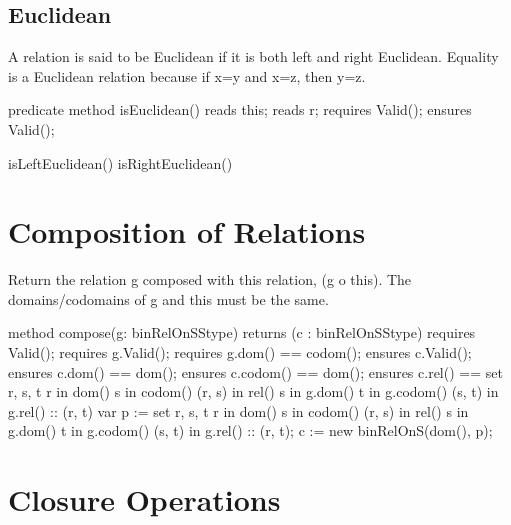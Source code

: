 \documentclass[letterpaper,10pt,english]{sphinxmanual}
\begin{document}
\subsection{Euclidean}
\label{\detokenize{08-relations:euclidean}}
A relation is said to be Euclidean if it is both left and right
Euclidean. Equality is a Euclidean relation because if x=y and x=z,
then y=z.

\begin{sphinxVerbatim}[commandchars=\\\{\}]
predicate method isEuclidean()
    reads this;
    reads r;
    requires Valid();
    ensures Valid();

\PYGZob{}
    isLeftEuclidean() \PYGZam{}\PYGZam{} isRightEuclidean()
\PYGZcb{}
\end{sphinxVerbatim}


\section{Composition of Relations}
\label{\detokenize{08-relations:composition-of-relations}}
Return the relation g composed with this relation, (g o this). The
domains/codomains of g and this must be the same.

\begin{sphinxVerbatim}[commandchars=\\\{\}]
method compose(g: binRelOnS\PYGZlt{}Stype\PYGZgt{})
    returns (c : binRelOnS\PYGZlt{}Stype\PYGZgt{})
    requires Valid();
    requires g.Valid();
    requires g.dom() == codom();
    ensures c.Valid();
    ensures c.dom() == dom();
    ensures c.codom() == dom();
    ensures c.rel() == set r, s, t \textbar{}
            r in dom() \PYGZam{}\PYGZam{}
            s in codom() \PYGZam{}\PYGZam{}
            (r, s) in rel() \PYGZam{}\PYGZam{}
            s in g.dom() \PYGZam{}\PYGZam{}
            t in g.codom() \PYGZam{}\PYGZam{}
            (s, t) in g.rel() ::
            (r, t)
\PYGZob{}
    var p := set r, s, t \textbar{}
            r in dom() \PYGZam{}\PYGZam{}
            s in codom() \PYGZam{}\PYGZam{}
            (r, s) in rel() \PYGZam{}\PYGZam{}
            s in g.dom() \PYGZam{}\PYGZam{}
            t in g.codom() \PYGZam{}\PYGZam{}
            (s, t) in g.rel() ::
            (r, t);
    c := new binRelOnS(dom(), p);
\PYGZcb{}
\end{sphinxVerbatim}


\section{Closure Operations}
\label{\detokenize{08-relations:closure-operations}}
\end{document}
